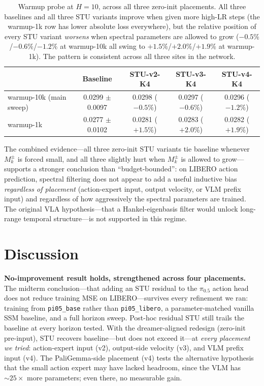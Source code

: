 \documentclass[10pt, letterpaper]{article}
\begin{document}
\begin{table}[h]
\centering
\small
\begin{tabular}{@{}lcccc@{}}
\toprule
& \textbf{Baseline} & \textbf{STU-v2-K4} & \textbf{STU-v3-K4} & \textbf{STU-v4-K4} \\
\midrule
warmup-10k (main sweep) & 0.0299 $\pm$ 0.0097 & 0.0298 ($-0.5\%$) & 0.0297 ($-0.6\%$) & 0.0296 ($-1.2\%$) \\
warmup-1k               & 0.0277 $\pm$ 0.0102 & 0.0281 ($+1.5\%$) & 0.0283 ($+2.0\%$) & 0.0282 ($+1.9\%$) \\
\bottomrule
\end{tabular}
\caption{Warmup probe at $H{=}10$, across all three zero-init placements. All three baselines and all three STU variants improve when given more high-LR steps (the warmup-1k row has lower absolute loss everywhere), but the relative position of every STU variant \emph{worsens} when spectral parameters are allowed to grow ($-0.5\%$/$-0.6\%$/$-1.2\%$ at warmup-10k all swing to $+1.5\%$/$+2.0\%$/$+1.9\%$ at warmup-1k). The pattern is consistent across all three sites in the network.}
\label{tab:warmup}
\end{table}

The combined evidence---all three zero-init STU variants tie baseline whenever $M_k^\pm$ is forced small, and all three slightly hurt when $M_k^\pm$ is allowed to grow---supports a stronger conclusion than ``budget-bounded'': on LIBERO action prediction, spectral filtering does not appear to add a useful inductive bias \emph{regardless of placement} (action-expert input, output velocity, or VLM prefix input) and regardless of how aggressively the spectral parameters are trained. The original VLA hypothesis---that a Hankel-eigenbasis filter would unlock long-range temporal structure---is not supported in this regime.

\section*{Discussion}

\textbf{No-improvement result holds, strengthened across four placements.}
The midterm conclusion---that adding an STU residual to the $\pi_{0.5}$ action head does not reduce training MSE on LIBERO---survives every refinement we ran: training from \texttt{pi05\_base} rather than \texttt{pi05\_libero}, a parameter-matched vanilla SSM baseline, and a full horizon sweep. Post-hoc residual STU still trails the baseline at every horizon tested. With the dreamer-aligned redesign (zero-init pre-input), STU recovers baseline---but does not exceed it---at \emph{every placement we tried}: action-expert input (v2), output-side velocity (v3), and VLM prefix input (v4). The PaliGemma-side placement (v4) tests the alternative hypothesis that the small action expert may have lacked headroom, since the VLM has $\sim 25\times$ more parameters; even there, no measurable gain.
\end{document}
